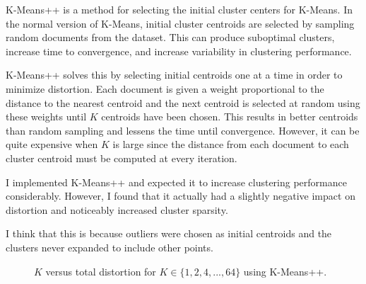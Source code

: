 \documentclass{article} %
\begin{document}
K-Means++ is a method for selecting the initial cluster centers for K-Means. In the normal version of K-Means, initial cluster centroids are selected by sampling random documents from the dataset. This can produce suboptimal clusters, increase time to convergence, and increase variability in clustering performance. 

K-Means++ solves this by selecting initial centroids one at a time in order to minimize distortion. Each document is given a weight proportional to the distance to the nearest centroid and the next centroid is selected at random using these weights until $K$ centroids have been chosen. This results in better centroids than random sampling and lessens the time until convergence. However, it can be quite expensive when $K$ is large since the distance from each document to each cluster centroid must be computed at every iteration.

I implemented K-Means++ and expected it to increase clustering performance considerably. However, I found that it actually had a slightly negative impact on distortion and noticeably increased cluster sparsity. 

I think that this is because outliers were chosen as initial centroids and the clusters never expanded to include other points.

\begin{figure}[h]
\begin{center}
\end{center}
\caption{$K$ versus total distortion for $K \in \{1,2,4,...,64\}$ using K-Means++.}
\end{figure}
\end{document}
